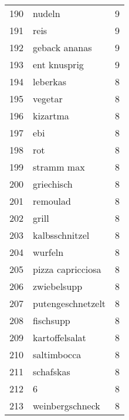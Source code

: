 \begin{tabular}{llr}
190  &                                             nudeln &      9 \\
191  &                                               reis &      9 \\
192  &                                      geback ananas &      9 \\
193  &                                       ent knusprig &      9 \\
194  &                                           leberkas &      8 \\
195  &                                            vegetar &      8 \\
196  &                                           kizartma &      8 \\
197  &                                                ebi &      8 \\
198  &                                                rot &      8 \\
199  &                                         stramm max &      8 \\
200  &                                         griechisch &      8 \\
201  &                                           remoulad &      8 \\
202  &                                              grill &      8 \\
203  &                                     kalbsschnitzel &      8 \\
204  &                                            wurfeln &      8 \\
205  &                                  pizza capricciosa &      8 \\
206  &                                        zwiebelsupp &      8 \\
207  &                                  putengeschnetzelt &      8 \\
208  &                                          fischsupp &      8 \\
209  &                                     kartoffelsalat &      8 \\
210  &                                        saltimbocca &      8 \\
211  &                                          schafskas &      8 \\
212  &                                                  6 &      8 \\
213  &                                    weinbergschneck &      8 \\

\end{tabular}
